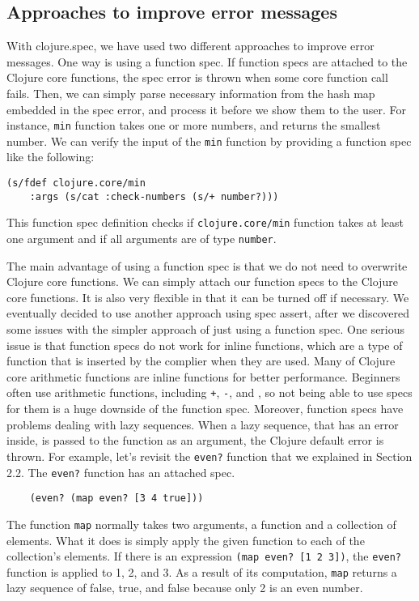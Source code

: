 \documentclass[12pt]{article}
\begin{document}
	\subsection{Approaches to improve error messages}\label{sec:approach}
	With clojure.spec, we have used two different approaches to improve error messages. One way is using a function spec. 
	If function specs are attached to the Clojure core functions, the spec error is thrown when some core function 
	call fails. Then, we can simply parse necessary information from the hash map embedded in the spec error, and 
	process it before we show them to the user. For instance, {\tt min} function 
	takes one or more numbers, and returns the smallest number. We can verify the input of the {\tt min} function by providing a 
	function spec like the following:

	\begin{verbatim}
(s/fdef clojure.core/min
    :args (s/cat :check-numbers (s/+ number?)))
	\end{verbatim}
	This function spec definition checks if {\tt clojure.core/min} function takes at least one argument 
	and if all arguments are of type {\tt number}.

	The main advantage of using a function spec is that we do not need to overwrite Clojure core functions. We can simply attach our 
	function specs to the Clojure core functions. It is also very flexible in that it can be turned off if necessary. 
	We eventually decided to use another approach using spec assert, after we 
	discovered some issues with the simpler approach of just using a function spec. 
	One serious issue is that function specs do not work for inline functions, which are a type of function 
	that is inserted by the complier when they are used.
	Many of Clojure core arithmetic functions are inline functions for better performance.
	Beginners often use arithmetic functions, including {\tt +}, {\tt -}, and {\tt *}, 
	so not being able to use specs for them is a huge downside of the function spec. 
	Moreover, function specs have problems dealing with lazy sequences. When a lazy sequence, 
	that has an error inside, is passed to the function as an argument, the Clojure default error is thrown. 
	For example, let's revisit the {\tt even?} function that we explained in Section 2.2. 
	The {\tt even?} function has an attached spec.
	\begin{verbatim}
	(even? (map even? [3 4 true]))
	\end{verbatim}
	
	The function {\tt map} normally takes two arguments, a function and a collection of elements. 
	What it does is simply apply the given function to each of the collection's elements. 
	If there is an expression {\tt (map even? [1 2 3])}, the {\tt even?} function is applied to 1, 2, and 3.
	As a result of its computation, {\tt map} returns a lazy sequence of false, true, and false
	because only 2 is an even number.
	
\end{document}
